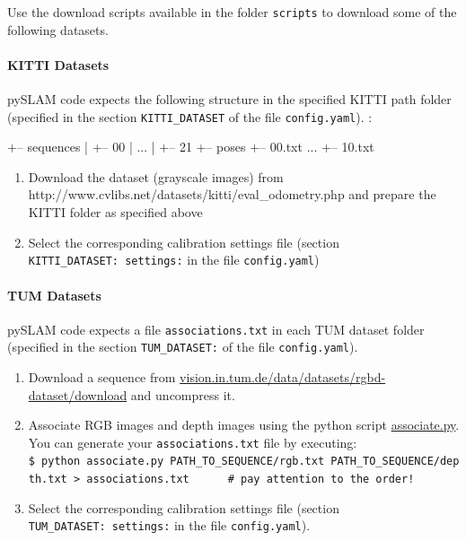 \documentclass{article}
\newenvironment{Shaded}{\begin{snugshade}}{\end{snugshade}}
\newcommand{\NormalTok}[1]{\textcolor[rgb]{0.74,0.68,0.62}{#1}}
\providecommand{\tightlist}{%
  \setlength{\itemsep}{0pt}\setlength{\parskip}{0pt}}
\let\oldparagraph\paragraph
\renewcommand{\paragraph}[1]{\oldparagraph{#1}\mbox{}}
\begin{document}
Use the download scripts available in the folder \texttt{scripts} to
download some of the following datasets.

\hypertarget{kitti-datasets}{%
\paragraph{KITTI Datasets}\label{kitti-datasets}}

pySLAM code expects the following structure in the specified KITTI path
folder (specified in the section \texttt{KITTI\_DATASET} of the file
\texttt{config.yaml}). :

\begin{scriptsize}
\begin{Shaded}
\begin{Highlighting}[]
\NormalTok{+-- sequences}
\NormalTok{|   +-- 00}
\NormalTok{|   ...}
\NormalTok{|   +-- 21}
\NormalTok{+-- poses}
\NormalTok{    +-- 00.txt}
\NormalTok{    ...}
\NormalTok{    +-- 10.txt}
\end{Highlighting}
\end{Shaded}
\end{scriptsize}

\begin{enumerate}
\def\labelenumi{\arabic{enumi}.}
\item
  Download the dataset (grayscale images) from
  http://www.cvlibs.net/datasets/kitti/eval\_odometry.php and prepare
  the KITTI folder as specified above
\item
  Select the corresponding calibration settings file (section
  \texttt{KITTI\_DATASET:\ settings:} in the file \texttt{config.yaml})
\end{enumerate}

\hypertarget{tum-datasets}{%
\paragraph{TUM Datasets}\label{tum-datasets}}

pySLAM code expects a file \texttt{associations.txt} in each TUM dataset
folder (specified in the section \texttt{TUM\_DATASET:} of the file
\texttt{config.yaml}).

\begin{enumerate}
\def\labelenumi{\arabic{enumi}.}
\tightlist
\item
  Download a sequence from
  \href{http://vision.in.tum.de/data/datasets/rgbd-dataset/download}{vision.in.tum.de/data/datasets/rgbd-dataset/download} and
  uncompress it.
\item
  Associate RGB images and depth images using the python script
  \href{http://vision.in.tum.de/data/datasets/rgbd-dataset/tools}{associate.py}.
  You can generate your \texttt{associations.txt} file by executing:\\
  \texttt{\$\ python\ associate.py\ PATH\_TO\_SEQUENCE/rgb.txt\ PATH\_TO\_SEQUENCE/depth.txt\ \textgreater{}\ associations.txt\ \ \ \ \ \ \#\ pay\ attention\ to\ the\ order!}
\item
  Select the corresponding calibration settings file (section
  \texttt{TUM\_DATASET:\ settings:} in the file \texttt{config.yaml}).
\end{enumerate}
\end{document}
